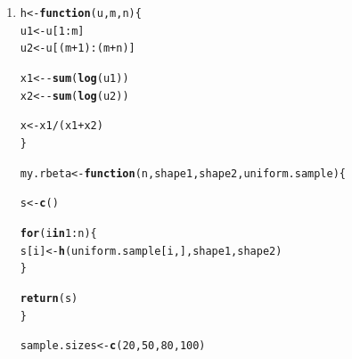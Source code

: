 \documentclass[11pt, a4paper]{article}\usepackage[]{graphicx}\usepackage[]{xcolor}
\makeatletter
\newcommand{\hlnum}[1]{\textcolor[rgb]{0.686,0.059,0.569}{#1}}%
\newcommand{\hlopt}[1]{\textcolor[rgb]{0,0,0}{#1}}%
\newcommand{\hldef}[1]{\textcolor[rgb]{0.345,0.345,0.345}{#1}}%
\newcommand{\hlkwa}[1]{\textcolor[rgb]{0.161,0.373,0.58}{\textbf{#1}}}%
\newcommand{\hlkwb}[1]{\textcolor[rgb]{0.69,0.353,0.396}{#1}}%
\newcommand{\hlkwc}[1]{\textcolor[rgb]{0.333,0.667,0.333}{#1}}%
\newcommand{\hlkwd}[1]{\textcolor[rgb]{0.737,0.353,0.396}{\textbf{#1}}}%
\newenvironment{kframe}{%
 \def\at@end@of@kframe{}%
 \ifinner\ifhmode%
  \def\at@end@of@kframe{\end{minipage}}%
  \begin{minipage}{\columnwidth}%
 \fi\fi%
 \def\FrameCommand##1{\hskip\@totalleftmargin \hskip-\fboxsep
 \colorbox{shadecolor}{##1}\hskip-\fboxsep
     \hskip-\linewidth \hskip-\@totalleftmargin \hskip\columnwidth}%
 \MakeFramed {\advance\hsize-\width
   \@totalleftmargin\z@ \linewidth\hsize
   \@setminipage}}%
 {\par\unskip\endMakeFramed%
 \at@end@of@kframe}
\newenvironment{knitrout}{}{} %
\makeatother
\begin{document}
\begin{enumerate}

\item[\scalebox{2.0}{\twemoji{keycap: 1}}]





\begin{knitrout}
\color{fgcolor}\begin{kframe}
\begin{alltt}
\hldef{h} \hlkwb{<-} \hlkwa{function}\hldef{(}\hlkwc{u}\hldef{,} \hlkwc{m}\hldef{,} \hlkwc{n}\hldef{)\{}
  \hldef{u1} \hlkwb{<-} \hldef{u[}\hlnum{1}\hlopt{:}\hldef{m]}
  \hldef{u2} \hlkwb{<-} \hldef{u[(m} \hlopt{+} \hlnum{1}\hldef{)} \hlopt{:} \hldef{(m} \hlopt{+} \hldef{n)]}

  \hldef{x1} \hlkwb{<-} \hlopt{-}\hlkwd{sum}\hldef{(}\hlkwd{log}\hldef{(u1))}
  \hldef{x2} \hlkwb{<-} \hlopt{-}\hlkwd{sum}\hldef{(}\hlkwd{log}\hldef{(u2))}

  \hldef{x} \hlkwb{<-} \hldef{x1} \hlopt{/} \hldef{(x1} \hlopt{+} \hldef{x2)}
\hldef{\}}
\end{alltt}
\end{kframe}
\end{knitrout}

\begin{knitrout}
\color{fgcolor}\begin{kframe}
\begin{alltt}
\hldef{my.rbeta} \hlkwb{<-} \hlkwa{function}\hldef{(}\hlkwc{n}\hldef{,} \hlkwc{shape1}\hldef{,} \hlkwc{shape2}\hldef{,} \hlkwc{uniform.sample}\hldef{)\{}

  \hldef{s} \hlkwb{<-} \hlkwd{c}\hldef{()}

  \hlkwa{for} \hldef{(i} \hlkwa{in} \hlnum{1}\hlopt{:}\hldef{n) \{}
    \hldef{s[i]} \hlkwb{<-} \hlkwd{h}\hldef{(uniform.sample[i,], shape1, shape2)}
  \hldef{\}}

  \hlkwd{return}\hldef{(s)}
\hldef{\}}
\end{alltt}
\end{kframe}
\end{knitrout}

\begin{knitrout}
\color{fgcolor}\begin{kframe}
\begin{alltt}
\hldef{sample.sizes} \hlkwb{<-} \hlkwd{c}\hldef{(}\hlnum{20}\hldef{,} \hlnum{50}\hldef{,} \hlnum{80}\hldef{,} \hlnum{100}\hldef{)}
\end{alltt}
\end{kframe}
\end{knitrout}


\end{enumerate}
\end{document}
